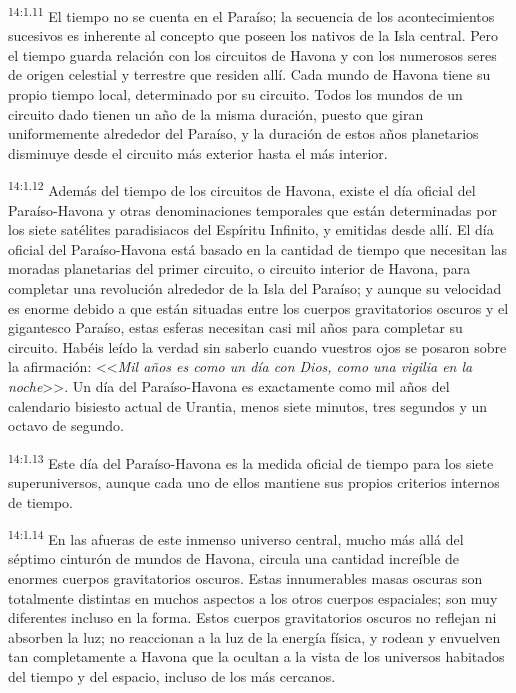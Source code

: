 \par
\textsuperscript{14:1.11} El tiempo no se cuenta en el Paraíso; la secuencia de los acontecimientos sucesivos es inherente al concepto que poseen los nativos de la Isla central. Pero el tiempo guarda relación con los circuitos de Havona y con los numerosos seres de origen celestial y terrestre que residen allí. Cada mundo de Havona tiene su propio tiempo local, determinado por su circuito. Todos los mundos de un circuito dado tienen un año de la misma duración, puesto que giran uniformemente alrededor del Paraíso, y la duración de estos años planetarios disminuye desde el circuito más exterior hasta el más interior.

\par
\textsuperscript{14:1.12} Además del tiempo de los circuitos de Havona, existe el día oficial del Paraíso-Havona y otras denominaciones temporales que están determinadas por los siete satélites paradisiacos del Espíritu Infinito, y emitidas desde allí. El día oficial del Paraíso-Havona está basado en la cantidad de tiempo que necesitan las moradas planetarias del primer circuito, o circuito interior de Havona, para completar una revolución alrededor de la Isla del Paraíso; y aunque su velocidad es enorme debido a que están situadas entre los cuerpos gravitatorios oscuros y el gigantesco Paraíso, estas esferas necesitan casi mil años para completar su circuito. Habéis leído la verdad sin saberlo cuando vuestros ojos se posaron sobre la afirmación: <<\textit{Mil años es como un día con Dios, como una vigilia en la noche}>>. Un día del Paraíso-Havona es exactamente como mil años del calendario bisiesto actual de Urantia, menos siete minutos, tres segundos y un octavo de segundo.

\par
\textsuperscript{14:1.13} Este día del Paraíso-Havona es la medida oficial de tiempo para los siete superuniversos, aunque cada uno de ellos mantiene sus propios criterios internos de tiempo.

\par
\textsuperscript{14:1.14} En las afueras de este inmenso universo central, mucho más allá del séptimo cinturón de mundos de Havona, circula una cantidad increíble de enormes cuerpos gravitatorios oscuros. Estas innumerables masas oscuras son totalmente distintas en muchos aspectos a los otros cuerpos espaciales; son muy diferentes incluso en la forma. Estos cuerpos gravitatorios oscuros no reflejan ni absorben la luz; no reaccionan a la luz de la energía física, y rodean y envuelven tan completamente a Havona que la ocultan a la vista de los universos habitados del tiempo y del espacio, incluso de los más cercanos.

